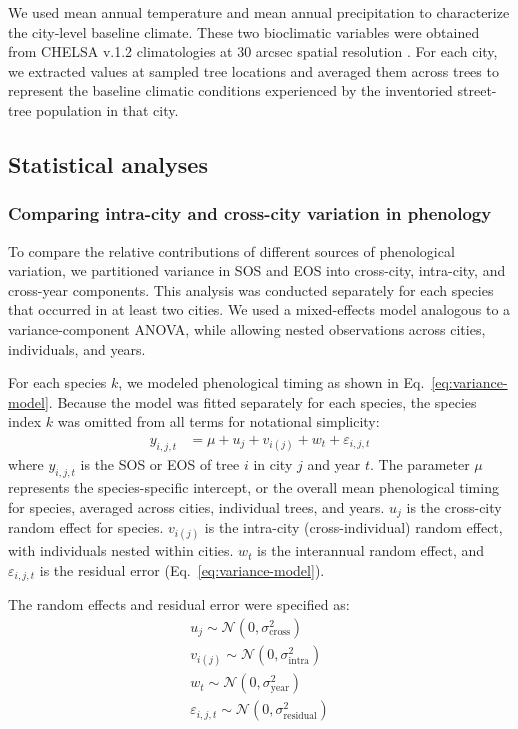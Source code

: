 We used mean annual temperature and mean annual precipitation to characterize the city-level baseline climate. These two bioclimatic variables were obtained from CHELSA v.1.2 climatologies at 30 arcsec spatial resolution \citep{Karger2017SciData}. For each city, we extracted values at sampled tree locations and averaged them across trees to represent the baseline climatic conditions experienced by the inventoried street-tree population in that city.

\subsection{Statistical analyses}

\subsubsection{Comparing intra-city and cross-city variation in phenology}

To compare the relative contributions of different sources of phenological variation, we partitioned variance in SOS and EOS into cross-city, intra-city, and cross-year components. This analysis was conducted separately for each species that occurred in at least two cities. We used a mixed-effects model analogous to a variance-component ANOVA, while allowing nested observations across cities, individuals, and years.

For each species $k$, we modeled phenological timing as shown in Eq.~\ref{eq:variance-model}. Because the model was fitted separately for each species, the species index $k$ was omitted from all terms for notational simplicity:
\begin{eqnarray}
y_{i,j,t}
&= \mu
+ u_{j}
+ v_{i(j)}
+ w_{t}
+ \varepsilon_{i,j,t}
\label{eq:variance-model}
\end{eqnarray}
where $y_{i,j,t}$ is the SOS or EOS of tree $i$ in city $j$ and year $t$. The parameter $\mu$ represents the species-specific intercept, or the overall mean phenological timing for species, averaged across cities, individual trees, and years. $u_{j}$ is the cross-city random effect for species. $v_{i(j)}$ is the intra-city (cross-individual) random effect, with individuals nested within cities. $w_{t}$ is the interannual random effect, and $\varepsilon_{i,j,t}$ is the residual error (Eq.~\ref{eq:variance-model}).

The random effects and residual error were specified as:
\begin{eqnarray}
u_{j} \sim \mathcal{N}(0, \sigma^2_{\mathrm{cross}}) \\
v_{i(j)} \sim \mathcal{N}(0, \sigma^2_{\mathrm{intra}}) \\
w_{t} \sim \mathcal{N}(0, \sigma^2_{\mathrm{year}}) \\
\varepsilon_{i,j,t} \sim \mathcal{N}(0, \sigma^2_{\mathrm{residual}})
\label{eq:variance-distribute}
\end{eqnarray}

